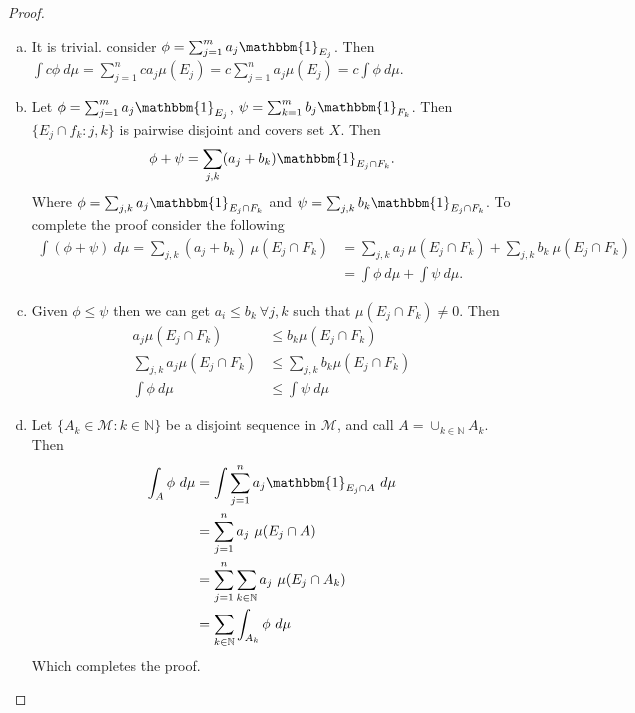 \documentclass[a4paper,english,12pt]{article}   	%
\begin{document}
\begin{proof}
\begin{enumerate}[a)]
\item It is trivial. consider $\phi = \sum_{j=1}^{m} a_{j}\mathbbm{1}_{E_{j}}$. Then $\int c \phi ~d\mu = \sum_{j=1}^{n} c a_{j} \mu(E_{j}) = c \sum_{j=1}^{n}  a_{j} \mu(E_{j}) = c \int \phi ~d\mu $.

\item Let $\phi = \sum_{j=1}^{m} a_{j}\mathbbm{1}_{E_{j}}$, $\psi = \sum_{k=1}^{m} b_{j}\mathbbm{1}_{F_{k}}$. Then $\{E_{j} \cap f_{k}\colon j,k\}$ is pairwise disjoint and covers set  $X$. Then 
\begin{align*}
\phi + \psi = \sum_{j,k} (a_{j}+b_{k}) \mathbbm{1}_{E_{j} \cap F_{k}}.
\end{align*}
Where $\phi  = \sum_{j,k} a_{j} \mathbbm{1}_{E_{j} \cap F_{k}}$ and $ \psi = \sum_{j,k} b_{k} \mathbbm{1}_{E_{j} \cap F_{k}}$. To complete the proof consider the following 
\begin{align*}
\int (\phi + \psi) ~d\mu = \sum_{j,k} (a_{j}+b_{k}) ~\mu(E_{j} \cap F_{k}) &= \sum_{j,k} a_{j} ~\mu(E_{j} \cap F_{k}) + \sum_{j,k} b_{k} ~\mu(E_{j} \cap F_{k}) \\&= \int \phi ~d\mu + \int \psi ~d\mu.
\end{align*}
\item Given  $\phi \leq \psi $ then we can get  $a_{i} \leq b_{k} ~\forall j,k$ such that $\mu(E_{j} \cap F_{k}) \neq 0$. Then 
\begin{align*}
a_{j} \mu(E_{j} \cap F_{k}) &\leq b_{k} \mu(E_{j} \cap F_{k}) \\
\sum_{j,k} a_{j} \mu(E_{j} \cap F_{k}) &\leq \sum_{j,k} b_{k} \mu(E_{j} \cap F_{k}) \\
\int \phi ~d\mu &\leq \int \psi ~d\mu
\end{align*}

\item Let $\{A_{k} \in \mathcal{M} \colon k \in \mathbb{N}\}$ be a disjoint sequence in $\mathcal{M}$, and call $A = \cup_{k \in \mathbb{N}} A_{k}$. Then 
\begin{align*}\int_{A} \phi ~d\mu &= \int \sum_{j=1}^{n} a_{j} \mathbbm{1}_{E_{j} \cap A} ~d\mu \\ &=\sum_{j=1}^{n} a_{j} ~\mu(E_{j}\cap A) \\ &= \sum_{j=1}^{n}\sum_{k \in \mathbb{N}} a_{j} ~\mu(E_{j} \cap A_{k}) \\ &= \sum_{k \in \mathbb{N}} \int_{A_{k}} \phi ~d\mu\end{align*}
Which completes the proof.
\end{enumerate}
\end{proof}
\end{document}
